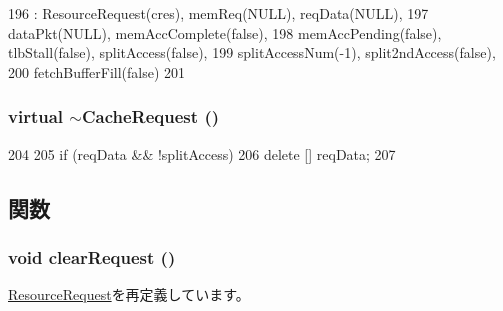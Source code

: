 \begin{DoxyCode}
196         :  ResourceRequest(cres), memReq(NULL), reqData(NULL),
197            dataPkt(NULL), memAccComplete(false),
198            memAccPending(false), tlbStall(false), splitAccess(false),
199            splitAccessNum(-1), split2ndAccess(false),
200            fetchBufferFill(false)
201     { }
\end{DoxyCode}
\hypertarget{classCacheRequest_a48decb676036a97918cc58ac4a86e99d}{
\subsubsection[{$\sim$CacheRequest}]{\setlength{\rightskip}{0pt plus 5cm}virtual $\sim${\bf CacheRequest} ()}}
\label{classCacheRequest_a48decb676036a97918cc58ac4a86e99d}



\begin{DoxyCode}
204     {
205         if (reqData && !splitAccess)
206             delete [] reqData;
207     }
\end{DoxyCode}


\subsection{関数}
\hypertarget{classCacheRequest_ace5d1d4025bbb180364fdcb74e7a7c57}{
\subsubsection[{clearRequest}]{\setlength{\rightskip}{0pt plus 5cm}void clearRequest ()}}
\label{classCacheRequest_ace5d1d4025bbb180364fdcb74e7a7c57}


\hyperlink{classResourceRequest_ace5d1d4025bbb180364fdcb74e7a7c57}{ResourceRequest}を再定義しています。


